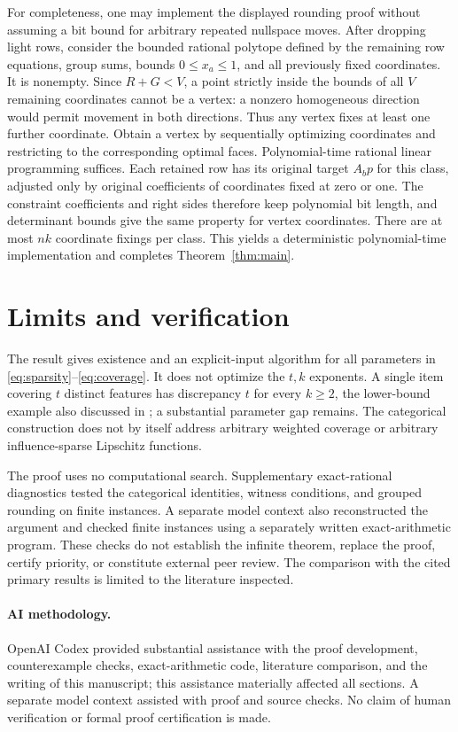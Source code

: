 \documentclass[acmsmall,11pt,nonacm]{acmart}
\begin{document}
For completeness, one may implement the displayed rounding proof without
assuming a bit bound for arbitrary repeated nullspace moves. After
dropping light rows, consider the bounded rational polytope defined by
the remaining row equations, group sums, bounds $0\le x_a\le1$, and all
previously fixed coordinates. It is nonempty. Since $R+G<V$, a point
strictly inside the bounds of all $V$ remaining coordinates cannot be a
vertex: a nonzero homogeneous direction would permit movement in both
directions. Thus any vertex fixes at least one further coordinate.
Obtain a vertex by sequentially optimizing coordinates and restricting
to the corresponding optimal faces. Polynomial-time rational linear
programming suffices. Each retained row has its original target $A_bp$
for this class, adjusted only by original coefficients of coordinates
fixed at zero or one. The constraint coefficients and right sides
therefore keep polynomial bit length, and determinant bounds give the
same property for vertex coordinates. There are at most $nk$ coordinate
fixings per class. This yields a deterministic polynomial-time
implementation and completes Theorem~\ref{thm:main}.

\section{Limits and verification}

The result gives existence and an explicit-input algorithm for all
parameters in \eqref{eq:sparsity}--\eqref{eq:coverage}. It does not optimize
the $t,k$ exponents. A single item covering $t$ distinct features has
discrepancy $t$ for every $k\ge2$, the lower-bound example also discussed
in \cite[Section~1.3]{ARW26}; a substantial parameter gap remains. The
categorical construction does not by itself address arbitrary weighted
coverage or arbitrary influence-sparse Lipschitz functions.

The proof uses no computational search. Supplementary exact-rational
diagnostics tested the categorical identities, witness conditions, and
grouped rounding on finite instances. A separate model context also
reconstructed the argument and checked finite instances using a separately
written exact-arithmetic program. These checks do not establish the
infinite theorem, replace the proof, certify priority, or constitute
external peer review. The comparison with the cited primary results is
limited to the literature inspected.

\paragraph{AI methodology.}
OpenAI Codex provided substantial assistance with the proof development,
counterexample checks, exact-arithmetic code, literature comparison, and
the writing of this manuscript; this assistance materially affected all
sections. A separate model context assisted with proof and source checks.
No claim of human verification or formal proof certification is made.

\clearpage


\end{document}
